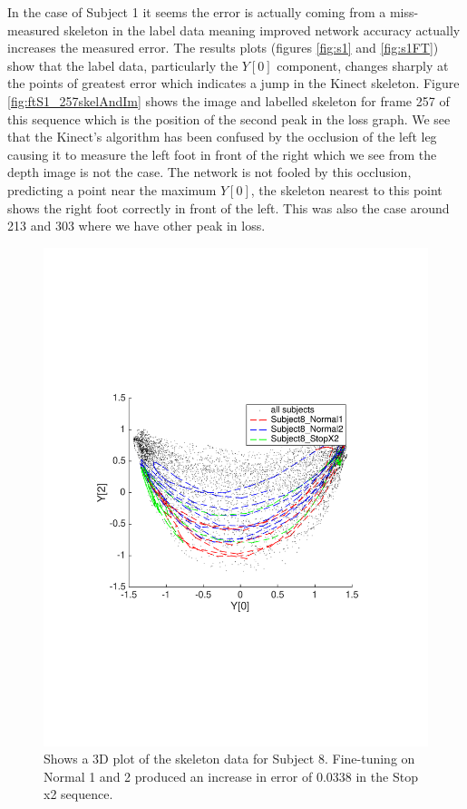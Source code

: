 \documentclass[11pt]{article} %
\begin{document}
In the case of Subject 1 it seems the error is actually coming from a miss-measured skeleton in the label data meaning improved network accuracy actually increases the measured error. The results plots (figures \ref{fig:s1} and \ref{fig:s1FT}) show that the label data, particularly the $Y[0]$ component, changes sharply at the points of greatest error which indicates a jump in the Kinect skeleton. Figure \ref{fig:ftS1_257skelAndIm} shows the image and labelled skeleton for frame 257 of this sequence which is the position of the second peak in the loss graph. We see that the Kinect's algorithm has been confused by the occlusion of the left leg causing it to measure the left foot in front of the right which we see from the depth image is not the case. The network is not fooled by this occlusion, predicting a point near the maximum $Y[0]$, the skeleton nearest to this point shows the right foot correctly in front of the left. This was also the case around 213 and 303 where we have other peak in loss. 

\begin{figure}
\centering
\includegraphics*[width=0.65\linewidth,trim={0.5cm 7.5cm 2.3cm 8.2cm},clip]{finetuning_s8.pdf} 
\caption{Shows a 3D plot of the skeleton data for Subject 8. Fine-tuning on Normal 1 and 2 produced an increase in error of 0.0338 in the Stop x2 sequence.}
\label{fig:ftS8}
\end{figure}
\end{document}
